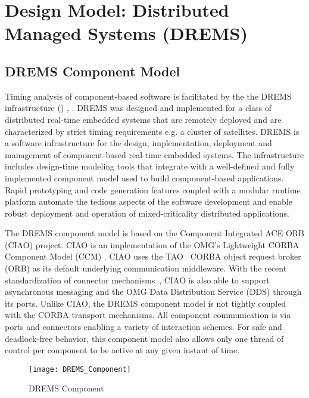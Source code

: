 \chapter{Design Model: Distributed Managed Systems (DREMS)}
\label{chapter:DREMS}

\section{DREMS Component Model}

Timing analysis of component-based software is facilitated by the the DREMS infrastructure (\iapfull) \cite{DREMS13Software}, \cite{ISIS_F6_ISORC:13}. DREMS was designed and implemented for a class of distributed real-time embedded systems that are remotely deployed and are characterized by strict timing requirements e.g. a cluster of satellites. DREMS is a software infrastructure for the design, implementation, deployment and management of component-based real-time embedded systems. The infrastructure includes design-time modeling tools \cite{ISIS_F6_SFFMT:13} that integrate with a well-defined and fully implemented component model \cite{ISIS_F6_ISORC:13, kumar2014colored} used to build component-based applications. Rapid prototyping and code generation features coupled with a modular runtime platform automate the tedious aspects of the software development and enable robust deployment and operation of mixed-criticality distributed applications.

The DREMS component model is based on the Component Integrated ACE ORB (CIAO) \cite{RT_CIAO:04, CIAO_Chap:04} project. CIAO is an implementation of the OMG's Lightweight CORBA Component Model (CCM) \cite{CCM-light:03}. CIAO uses the
TAO~\cite{TAO:02} CORBA object request broker (ORB) as its default underlying
communication middleware.  With the recent standardization of connector mechanisms~\cite{dds4ccm:09}, CIAO is also able to support asynchronous messaging and the OMG Data Distribution Service (DDS) through its ports. Unlike CIAO, the DREMS component model is not tightly coupled with the CORBA transport mechanisms. All component communication is via ports and connectors \cite{Connectors} enabling a variety of interaction schemes. For safe and deadlock-free behavior, this component model also allows only one thread of control per component to be active at any given instant of time. 

\begin{figure}[h]
	\centering
	\texttt{[image: DREMS\_Component]}
	\caption{DREMS Component}
	\label{fig:DREMS_Component}
	\vspace{-0.1in}
\end{figure}


